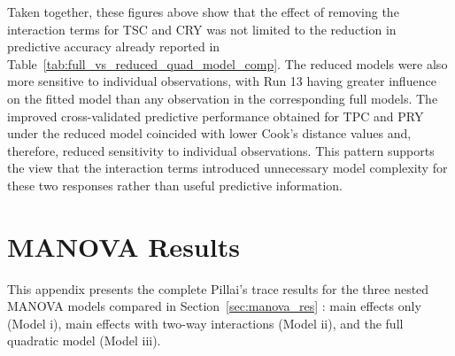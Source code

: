 \documentclass[MScDSA]{uccthesis}
\begin{document}
Taken together, these figures above show that the effect of removing the interaction terms for TSC and CRY was not limited to the reduction in predictive accuracy already reported in Table~\ref{tab:full_vs_reduced_quad_model_comp}. The reduced models were also more sensitive to individual observations, with Run 13 having greater influence on the fitted model than any observation in the corresponding full models. The improved cross-validated predictive performance obtained for TPC and PRY under the reduced model coincided with lower Cook's distance values and, therefore, reduced sensitivity to individual observations. This pattern supports the view that the interaction terms introduced unnecessary model complexity for these two responses rather than useful predictive information.


\chapter{MANOVA Results}
\label{app:manova}
This appendix presents the complete Pillai's trace results for the three nested MANOVA models compared in Section~\ref{sec:manova_res} : main effects only (Model i), main effects with two-way interactions (Model ii), and the full quadratic model (Model iii).
\end{document}
